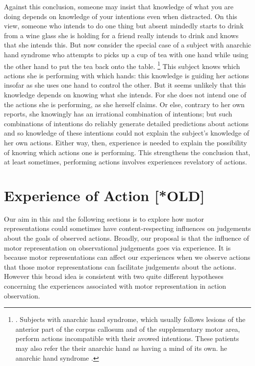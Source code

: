 \documentclass[12pt,\papersize]{extarticle}
\begin{document}
Against this conclusion, someone may insist that knowledge of what you are doing depends on knowledge of your intentions even when distracted.  On this view, someone who intends to do one thing but absent mindedly starts to drink from a wine glass she is holding for a friend really intends to drink and knows that she intends this. But now consider the special case of a subject with anarchic hand syndrome who attempts to picks up a cup of tea with one hand while using the other hand to put the tea back onto the table.%
\footnote{
\citet[p.\ 1114]{della_sala:1991_anarchic}. Subjects with anarchic hand syndrome, which usually follows lesions of the anterior part of the corpus callosum and of the supplementary motor area, perform actions incompatible with their avowed intentions. These patients may also refer the their anarchic hand as having a mind of its own. he anarchic hand syndrome \citep{della_sala:1994fk}.
} 
%
This subject knows which actions she is performing with which hands: this knowledge is guiding her actions insofar as she uses one hand to control the other.  But it seems unlikely that this knowledge depends on knowing what she intends.  For she does not intend one of the actions she is performing, as she herself claims.  Or else, contrary to her own reports, she knowingly has an irrational combination of intentions; but such combinations of intentions do reliably generate detailed predictions about actions and so knowledge of these intentions could not explain the subject's knowledge of her own actions.  Either way, then, experience is needed to explain the possibility of knowing which actions one is performing.  This strengthens the conclusion that, at least sometimes, performing actions involves experiences revelatory of actions.  








\section{Experience of Action [*OLD]}
\label{sec:processes}
Our aim in this and the following sections is to explore how motor representations could sometimes have content-respecting influences on judgements about the goals of observed actions. Broadly, our proposal is that the influence of motor representation on observational judgements goes via experience.  It is because motor representations can affect our experiences when we observe actions that those motor representations can facilitate judgements about the actions. However this broad idea is consistent with two quite different hypotheses concerning the experiences associated with motor representation in action observation. 
\end{document}
